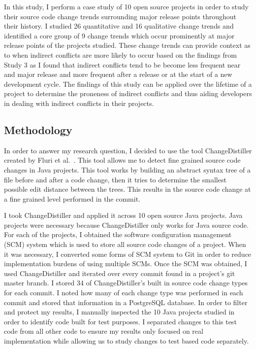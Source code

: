In this study, I perform a case study of 10 open source projects in order to study their source code change trends surrounding major release points
throughout their history. I studied 26 quantitative and 16 qualitative change trends and identified a core group of 9 change trends which occur
prominently at major release points of the projects studied. These change trends can provide context as to when indirect conflicts are more likely
to occur based on the findings from Study 3 as I found that indirect conflicts tend to be become less frequent near and major release and more
frequent after a release or at the start of a new development cycle. The findings of this study can be applied over the lifetime of a project
to determine the proneness of indirect conflicts and thus aiding developers in dealing with indirect conflicts in their projects.

\subsection{Methodology}
\label{sec:apie-meth}
In order to answer my research question, I decided to use the tool ChangeDistiller created by Fluri et al.~\cite{Fluri:2007:CDT}. This tool allows me to detect fine grained
source code changes in Java projects. This tool works by building an abstract syntax tree of a file before and after a code change, then it tries to determine
the smallest possible edit distance between the trees. This results in the source code change at a fine grained level performed in the commit.

I took ChangeDistiller and applied it across 10 open source Java projects. Java projects were necessary because ChangeDistiller only works for Java source code.
For each of the projects, I obtained the software configuration management (SCM) system
which is used to store all source code changes of a project. When it was necessary, I converted some forms of SCM system to Git in order to reduce implementation
burdens of using multiple SCMs. Once the SCM was obtained, I used ChangeDistiller and iterated over every commit found in a project's git master branch. I stored
34 of ChangeDistiller's built in source code change types for each commit. I noted how many of each change type was performed in each commit and stored that information
in a PostgreSQL database. In order to filter and protect my results, I manually inspected the 10 Java projects studied in order to identify code built for test
purposes.
I separated changes to this test code from all other code to ensure my results only focused on real implementation while allowing us to study changes to
test based code separately.

